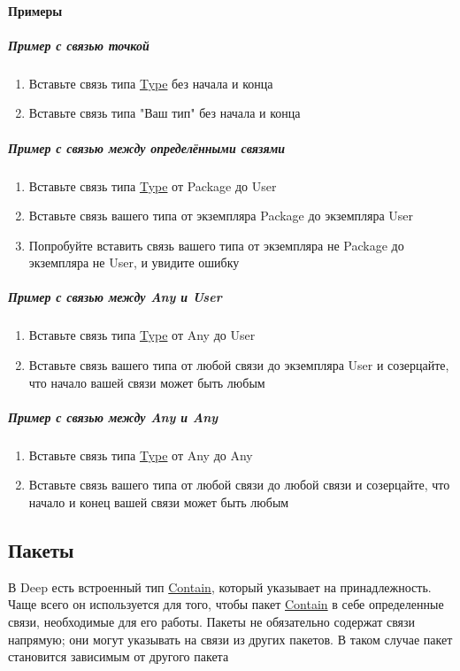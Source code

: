 \documentclass{article}
\begin{document}
\paragraph{Примеры}
\subparagraph{Пример с связью точкой}
\begin{enumerate}
  \item Вставьте связь типа \hyperlink{type.Def}{Type} без начала и конца
  \item Вставьте связь типа "Ваш тип" без начала и конца
\end{enumerate}
\subparagraph{Пример с связью между определёнными связями}
\begin{enumerate}
  \item Вставьте связь типа \hyperlink{type.Def}{Type} от Package до User
  \item Вставьте связь вашего типа от экземпляра Package до экземпляра User
  \item Попробуйте вставить связь вашего типа от экземпляра не Package до
        экземпляра не User, и увидите ошибку
\end{enumerate}
\subparagraph{Пример с связью между Any и User}
\begin{enumerate}
  \item Вставьте связь типа \hyperlink{type.Def}{Type} от Any до User
  \item Вставьте связь вашего типа от любой связи до экземпляра User и
        созерцайте, что начало вашей связи может быть любым
\end{enumerate}
\subparagraph{Пример с связью между Any и Any}
\begin{enumerate}
  \item Вставьте связь типа \hyperlink{type.Def}{Type} от Any до Any
  \item Вставьте связь вашего типа от любой связи до любой связи и
        созерцайте, что начало и конец вашей связи может быть любым
\end{enumerate}
\subsection{Пакеты}

В Deep есть встроенный тип \hyperlink{Contain.Def}{Contain}, который указывает на
принадлежность. Чаще всего он используется для того, чтобы пакет
\hyperlink{Contain.Def}{Contain} в себе определенные связи, необходимые для его работы.
Пакеты не обязательно содержат связи напрямую; они могут
указывать на связи из других пакетов. В таком случае пакет
становится зависимым от другого пакета
\end{document}
